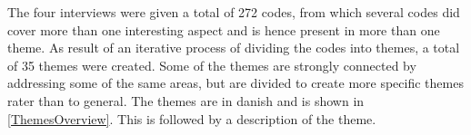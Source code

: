 The four interviews were given a total of 272 codes, from which several codes did cover more than one interesting aspect and is hence present in more than one theme. As result of an iterative process of dividing the codes into themes, a total of 35 themes were created. Some of the themes are strongly connected by addressing some of the same areas, but are divided to create more specific themes rater than to general. The themes are in danish and is shown in \autoref{ThemesOverview}. This is followed by a description of the theme.





